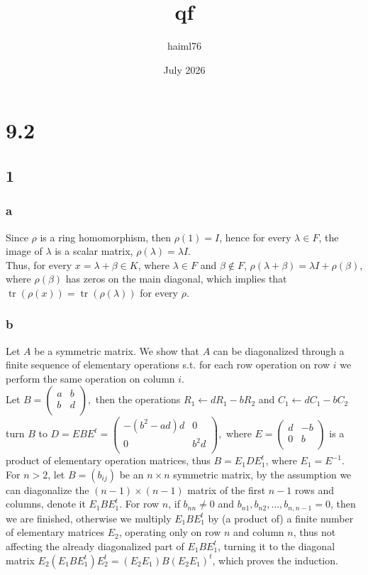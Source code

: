 \documentclass{article}
\title{qf}
\author{haiml76 }
\date{July 2026}
\DeclareMathOperator{\tr}{tr}
\begin{document}
\maketitle

\section*{9.2}
\subsection*{1}
\subsubsection*{a}
Since $\rho$ is a ring homomorphism, then $\rho(1)=I$, hence for every $\lambda\in{F}$, the image of $\lambda$ is  a scalar matrix, 
$\rho(\lambda)=\lambda{I}$.\\ Thus, for every $x=\lambda+\beta\in{K}$, where $\lambda\in{F}$ and $\beta\notin{F}$, $\rho(\lambda+\beta)=\lambda{I}+\rho(\beta)$, where $\rho(\beta)$ has zeros on the main diagonal, which implies that $\tr(\rho(x))=\tr(\rho(\lambda))$ for every $\rho$.
\subsubsection*{b}



Let $A$ be a symmetric matrix. We show that $A$ can be diagonalized through a finite sequence of elementary operations s.t. for each row operation on row $i$ we perform the same operation on column $i$.\\
Let $B=\begin{pmatrix}
a&b\\
b&d\\
\end{pmatrix},$
then the operations $R_1\leftarrow{d}R_1-bR_2$ and $C_1\leftarrow{d}C_1-bC_2$ turn $B$ to $D=EBE^t=\begin{pmatrix}
-(b^2-ad)d &0\\
0&b^2d\\
\end{pmatrix},$
where $E=\begin{pmatrix}
d&-b\\
0&b\\
\end{pmatrix}$
is a product of elementary operation matrices, thus $B=E_1DE_1^t$, where $E_1=E^{-1}$.\\
For $n>2$, let $B=(b_{ij})$ be an $n\times{n}$ symmetric matrix, by the assumption we can diagonalize the $(n-1)\times(n-1)$ matrix of the first $n-1$ rows and columns, denote it $E_1BE_1^t$. For row $n$, if $b_{nn}\neq{0}$ and $b_{n1},b_{n2},\dots,b_{n,n-1}=0$, then we are finished, otherwise we multiply $E_1BE_1^t$ by (a product of) a finite number of elementary matrices $E_2$, operating only on row $n$ and column $n$, thus not affecting the already diagonalized part of $E_1BE_1^t$, turning it to the diagonal matrix $E_2(E_1BE_1^t)E_2^t=(E_2E_1)B(E_2E_1)^t$, which proves the induction.
\end{document}
